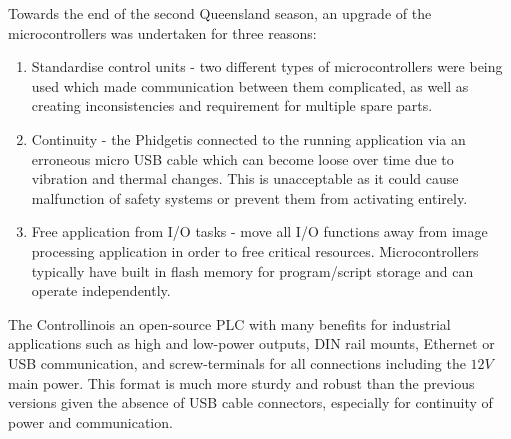 \documentclass[fleqn,twoside,12pt]{report}
\begin{document}
Towards the end of the second Queensland season, an upgrade of the microcontrollers was undertaken for three reasons:

\begin{enumerate}
	\item Standardise control units - two different types of microcontrollers were being used which made communication between them complicated, as well as creating inconsistencies and requirement for multiple spare parts.
	\item Continuity - the Phidget\texttrademark is connected to the running application via an erroneous micro USB cable which can become loose over time due to vibration and thermal changes. This is unacceptable as it could cause malfunction of safety systems or prevent them from activating entirely. 
	\item Free application from I/O tasks - move all I/O functions away from image processing application in order to free critical resources. Microcontrollers typically have built in flash memory for program/script storage and can operate independently.
\end{enumerate}

The Controllino\texttrademark is an open-source PLC with many benefits for industrial applications such as high and low-power outputs, DIN rail mounts, Ethernet or USB communication, and screw-terminals for all connections including the $12V$ main power. This format is much more sturdy and robust than the previous versions given the absence of USB cable connectors, especially for continuity of power and communication.
\end{document}
